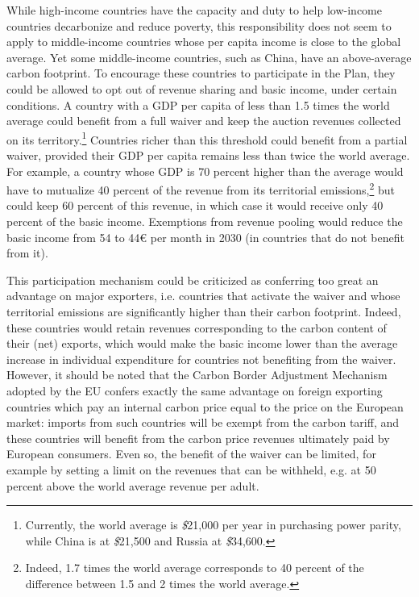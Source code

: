 \documentclass[a5paper,english,openany]{memoir}
\begin{document}
While high-income countries have the capacity and duty to help low-income countries decarbonize %
and reduce poverty, this responsibility does not seem to apply to middle-income countries whose per capita income is close to the global average. Yet some middle-income countries, such as China, have an above-average carbon footprint. To encourage these countries to participate in the Plan, they could be allowed to opt out of revenue sharing and basic income, under certain conditions. A country with a GDP per capita of less than 1.5 times the world average could benefit from a full waiver and keep the auction revenues collected on its territory.\footnote{Currently, the world average is \textit{\$}21,000 per year in purchasing power parity, while China is at \textit{\$}21,500 and Russia at \textit{\$}34,600.}  
Countries richer than this threshold could benefit from a partial waiver, provided their GDP per capita remains less than twice the world average. For example, a country whose GDP is 70 percent higher than the average would have to mutualize %
40 percent of the revenue from its territorial emissions,\footnote{Indeed, 1.7 times the world average corresponds to 40 percent of the difference between 1.5 and 2 times the world average.} but could keep 60 percent of this revenue, in which case it would receive only 40 percent of the basic income. Exemptions from revenue pooling would reduce the basic income from 54 to 44\euro{} per month in 2030 (in countries that do not benefit from it). 

This participation mechanism could be criticized %
as conferring too great an advantage on major exporters, i.e. countries that activate the waiver and whose territorial emissions are significantly higher than their carbon footprint. Indeed, these countries would retain revenues corresponding to the carbon content of their (net) exports, which would make the basic income lower than the average increase in individual expenditure for countries not benefiting %
from the waiver. However, it should be noted %
that the Carbon Border Adjustment Mechanism adopted by the EU confers exactly the same advantage on foreign exporting countries which pay an internal carbon price equal to the price on the European market: imports from such countries will be exempt from the carbon tariff, %
and these countries will benefit from the carbon price revenues ultimately paid by European consumers. Even so, the benefit of the waiver can be limited, for example by setting a limit on the revenues that can be withheld, e.g. at 50 percent above the world average revenue per adult. %
\end{document}
